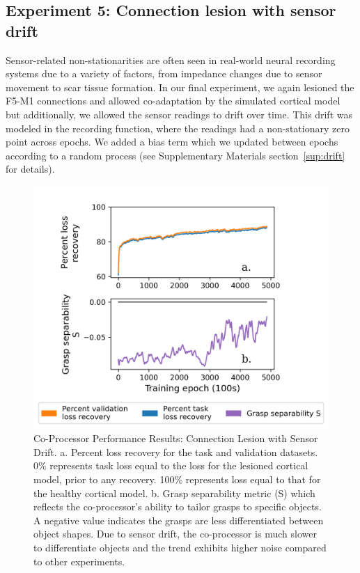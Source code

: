 \documentclass[12pt]{iopart}
\begin{document}
\subsection{Experiment 5: Connection lesion with sensor drift}
Sensor-related non-stationarities are
often seen in real-world neural recording systems due to a variety of factors, from impedance
changes due to sensor movement to scar tissue formation. In our final experiment, we again lesioned the F5-M1
connections and allowed co-adaptation by the simulated cortical model but additionally, we allowed the sensor
readings to drift over time. This drift was modeled in the recording function, where the readings had a non-stationary
zero point across epochs. We added a bias term which we updated between epochs according to a random process
(see Supplementary Materials section~\ref{sup:drift} for details). 

\begin{figure}[h]
\centering
\includegraphics[scale=1]{training_results_drift.png}
\caption{Co-Processor Performance Results: Connection Lesion with Sensor Drift. a. 
         Percent loss recovery for the task and validation datasets. 0\% represents task loss equal to the loss for
         the lesioned cortical model, prior to any recovery. 100\% represents
         loss equal to that for the healthy cortical model. 
         b. Grasp separability metric (S) which reflects the co-processor's ability
         to tailor grasps to specific objects. A negative value indicates the grasps are less
         differentiated between object shapes. Due to sensor drift, the co-processor
         is much slower to differentiate objects and the trend exhibits 
         higher noise compared to other experiments.}
\label{fig:results_drift}
\end{figure}
\end{document}
